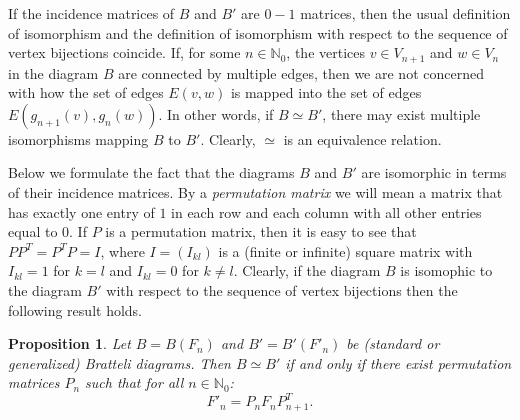 \documentclass[11pt, twoside]{amsart}
\theoremstyle{definition}
\theoremstyle{remark}
\theoremstyle{plain}
\newtheorem{prop}[definition]{Proposition}
\newcommand{\N}{\mathbb N}
\numberwithin{equation}{section}
\begin{document}
If the incidence matrices of $B$ and $B'$ are $0-1$ matrices, then the usual definition of isomorphism and the definition of isomorphism with respect to the sequence of vertex bijections coincide. If, for some $n \in \N_0$, the vertices $v \in V_{n+1}$ and $w \in V_n$ in the diagram $B$ are connected by multiple edges, then we are not concerned with how the set of edges $E(v, w)$ is mapped into the set of edges $E(g_{n+1}(v), g_n(w))$. In other words, if $B \simeq B'$, there may exist multiple isomorphisms mapping $B$ to $B'$. Clearly, $\simeq$ is an equivalence relation.





Below we formulate the fact that the diagrams $B$ and $B'$ are isomorphic in terms of their incidence matrices.
By a \textit{permutation matrix} we will mean a matrix that has exactly one entry of $1$ in each row and each column with all other entries equal to $0$. If $P$ is a permutation matrix, then it is easy to see that $PP^T = P^TP = I$, where $I = (I_{kl})$ is a (finite or infinite) square matrix with $I_{kl} = 1$ for $k = l$ and $I_{kl} = 0$ for $k \neq l$. Clearly, if the diagram $B$ is isomophic to the diagram $B'$ with respect to the sequence of vertex bijections then the following result holds.

\begin{prop}\label{thm:isomBD}
    Let $B= B(F_n)$ and $B' = B'(F'_n)$ be (standard or generalized) Bratteli diagrams. Then $B \simeq B'$ if and only if there exist permutation matrices $P_n$ such that for all $n \in \N_0$:
    $$
    F'_n = P_n F_n P_{n+1}^T.
    $$
\end{prop}
\end{document}
